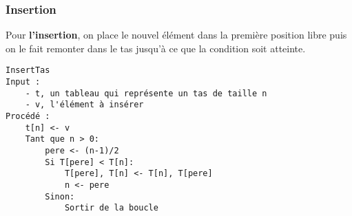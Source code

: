 \documentclass{../cours}
\begin{document}
\subsubsection{Insertion}

Pour \textbf{l'insertion}, on place le nouvel élément dans la première position libre puis on le fait remonter dans le tas jusqu'à ce que la condition soit atteinte. 

\begin{lstlisting}
InsertTas
Input : 
    - t, un tableau qui représente un tas de taille n
    - v, l'élément à insérer 
Procédé :
    t[n] <- v
    Tant que n > 0:
        pere <- (n-1)/2
        Si T[pere] < T[n]:
            T[pere], T[n] <- T[n], T[pere]
            n <- pere
        Sinon:
            Sortir de la boucle
\end{lstlisting} 
\end{document}
